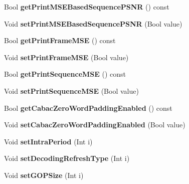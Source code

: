 \begin{DoxyCompactItemize}
\item 
\mbox{\label{class_t_enc_cfg_a92e1010cc677ba6d76970bef2976576f}} 
Bool {\bfseries get\+Print\+M\+S\+E\+Based\+Sequence\+P\+S\+NR} () const
\item 
\mbox{\label{class_t_enc_cfg_a375360803274f150e2680569bd9558eb}} 
Void {\bfseries set\+Print\+M\+S\+E\+Based\+Sequence\+P\+S\+NR} (Bool value)
\item 
\mbox{\label{class_t_enc_cfg_a05e00d8c08f39a4efa2ea3a94a0829a2}} 
Bool {\bfseries get\+Print\+Frame\+M\+SE} () const
\item 
\mbox{\label{class_t_enc_cfg_a8c0efa27663430070133639b6aed66b3}} 
Void {\bfseries set\+Print\+Frame\+M\+SE} (Bool value)
\item 
\mbox{\label{class_t_enc_cfg_a01d73636d52f7c37b58424caf7326e8e}} 
Bool {\bfseries get\+Print\+Sequence\+M\+SE} () const
\item 
\mbox{\label{class_t_enc_cfg_a52461bab930806f6ce5c947cbbb5d296}} 
Void {\bfseries set\+Print\+Sequence\+M\+SE} (Bool value)
\item 
\mbox{\label{class_t_enc_cfg_a53d83f5f6199d6674ffaa02b3e69f04b}} 
Bool {\bfseries get\+Cabac\+Zero\+Word\+Padding\+Enabled} () const
\item 
\mbox{\label{class_t_enc_cfg_ac00be11b16970c33026ee2c3d1ccca2f}} 
Void {\bfseries set\+Cabac\+Zero\+Word\+Padding\+Enabled} (Bool value)
\item 
\mbox{\label{class_t_enc_cfg_abca36901af0b98befa1309d2d9066821}} 
Void {\bfseries set\+Intra\+Period} (Int i)
\item 
\mbox{\label{class_t_enc_cfg_a48a711c912565c652e93e522fe4d3725}} 
Void {\bfseries set\+Decoding\+Refresh\+Type} (Int i)
\item 
\mbox{\label{class_t_enc_cfg_a3f12b2e507545359b151328a3844dddd}} 
Void {\bfseries set\+G\+O\+P\+Size} (Int i)
\item 

\end{DoxyCompactItemize}
